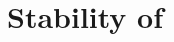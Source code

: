\documentclass[aps,pre,preprint,groupedaddress]{revtex4}
\begin{document}
\section{Stability of \reqva}
    




\end{document}
